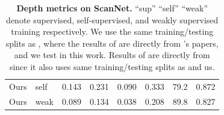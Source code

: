 \begin{table}[]
\begin{tabular}{llllllll}
Ours  & self                    &0.143    & 0.231    & 0.090  & 0.333 & 79.2 & 0.872 \\
Ours  & weak                    &0.089    & 0.134    & 0.038  & 0.208 & 89.8 & 0.827 \\\hline
\end{tabular}
\vspace{-3mm}
\caption{\textbf{Depth metrics on ScanNet.} ``sup'' ``self'' ``weak'' denote supervised, self-supervised, and weakly supervised training respectively. We use the same training/testing splits as \cite{atlas, neucon}, where the results of \cite{mvdepthnet,gpmvs,dpsnet,colmap} are directly from \cite{atlas, neucon}'s papers, and we test \cite{distdepth,p2net,structdepth} in this work. Results of \cite{monodepth2, mononerf} are directly from \cite{mononerf} since it also uses same training/testing splits as \cite{atlas,neucon} and us. 
}
\label{table:scannet_depth}
\end{table}
\fi

